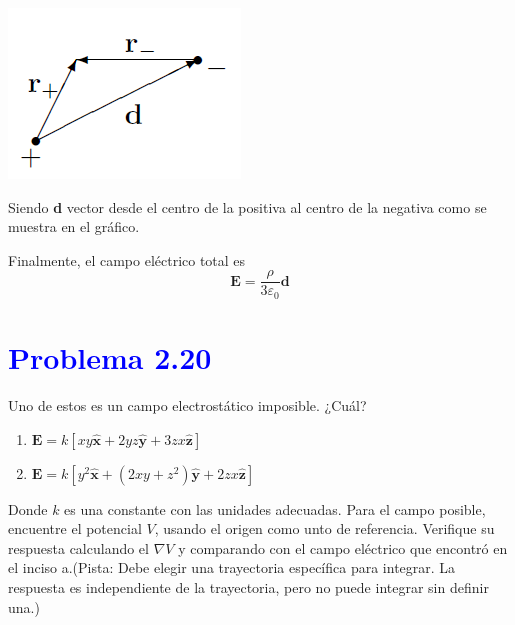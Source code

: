 \documentclass[12pt]{article}
\newcommand{\question}[1]{\textcolor{blue}{\textbf{#1}}}
\begin{document}
\begin{minipage}{0.25\textwidth}
    \includegraphics[width=\linewidth]{imagenes/4_IMG.png}
    \label{fig:}
\end{minipage}
\hfill
\begin{minipage}{0.6\textwidth}
    Siendo \textbf{d} vector desde el centro de la positiva al centro de la negativa como se muestra en el gráfico.
\end{minipage}

Finalmente, el campo eléctrico total es
\[
\boxed{\textbf{E} = \frac{\rho}{3 \varepsilon_0} \textbf{d}}
\]



\section*{\question{ Problema 2.20}} Uno de estos es un campo electrostático imposible. ¿Cuál?

\begin{enumerate}[label=(\alph*)]
    \item  \(\mathbf{E} = k[xy \mathbf{ \hat{x}}+ 2yz\mathbf{ \hat{y}}+ 3zx\mathbf{ \hat{z}}] \)
    \item \(\mathbf{E} = k[y^2\mathbf{ \hat{x}}+ (2xy + z^2)\mathbf{ \hat{y}}+ 2zx\mathbf{ \hat{z}}] \)
\end{enumerate}

Donde \(k\)  es una constante con las unidades adecuadas. Para el campo posible, encuentre el potencial \(V\), usando el origen como unto de referencia. Verifique su respuesta calculando el \(\nabla V\) y comparando con el campo eléctrico que encontró en el inciso a.(Pista: Debe elegir una trayectoria específica para integrar. La respuesta es independiente de la trayectoria, pero no puede integrar sin definir una.)
\end{document}
